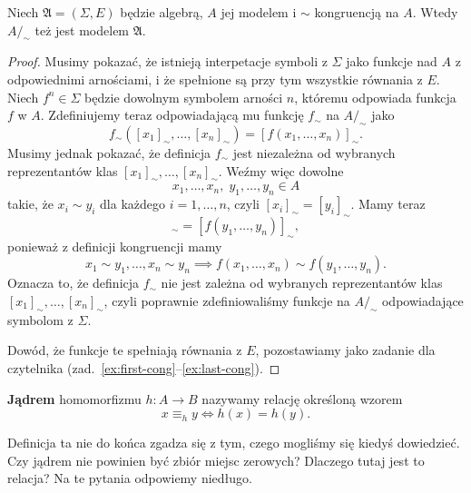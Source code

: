 \begin{theorem}\label{th:cong-model}
	Niech $\mathfrak{A} = (\Sigma, E)$ będzie algebrą,
		$A$ jej modelem i $\sim$ kongruencją na $A$.
	Wtedy $A/_\sim$ też jest modelem $\mathfrak{A}$.
\end{theorem}
\begin{proof}
	Musimy pokazać,
		że istnieją interpetacje symboli z $\Sigma$ jako funkcje nad $A$ z odpowiednimi
		arnościami,
		i że spełnione są przy tym wszystkie równania z $E$.
	Niech $f^n \in \Sigma$ będzie dowolnym symbolem arności $n$,
		któremu odpowiada funkcja $f$ w $A$.
	Zdefiniujemy teraz odpowiadającą mu funkcję $f_\sim$ na $A/_\sim$ jako
	\begin{equation}
		f_\sim([x_1]_\sim, \dots, [x_n]_\sim) = [f(x_1, \dots, x_n)]_\sim.
	\end{equation}
	Musimy jednak pokazać,
		że definicja $f_\sim$ jest niezależna od wybranych reprezentantów klas $[x_1]_\sim, \dots, [x_n]_\sim$.
	Weźmy więc dowolne
	\begin{equation}
		x_1, \dots, x_n,\;y_1, \dots, y_n \in A
	\end{equation}
		takie,
		że $x_i \sim y_i$ dla każdego $i = 1, \dots, n$,
		czyli $[x_i]_\sim = [y_i]_\sim$.
	Mamy teraz
	\begin{equation}
		[f(x_1, \dots, x_n)]_\sim = [f(y_1, \dots, y_n)]_\sim,
	\end{equation}
	ponieważ z definicji kongruencji mamy
	\begin{equation}
		x_1 \sim y_1, \dots, x_n \sim y_n \implies f(x_1, \dots, x_n) \sim f(y_1, \dots, y_n).
	\end{equation}
	Oznacza to,
		że definicja $f_\sim$ nie jest zależna od wybranych reprezentantów klas $[x_1]_\sim, \dots, [x_n]_\sim$,
	czyli poprawnie zdefiniowaliśmy funkcje na $A/_\sim$ odpowiadające symbolom z $\Sigma$.

	Dowód,
		że funkcje te spełniają równania z $E$,
		pozostawiamy jako zadanie dla czytelnika (zad.~\ref{ex:first-cong}--\ref{ex:last-cong}).
\end{proof}

\begin{definition}
	\textbf{Jądrem} homomorfizmu $h: A \to B$ nazywamy relację określoną wzorem
	\begin{equation}
		x \equiv_h y \iff h(x) = h(y).
	\end{equation}
\end{definition}

Definicja ta nie do końca zgadza się z tym,
	czego mogliśmy się kiedyś dowiedzieć.
Czy jądrem nie powinien być zbiór miejsc zerowych?
Dlaczego tutaj jest to relacja?
Na te pytania odpowiemy niedługo.

